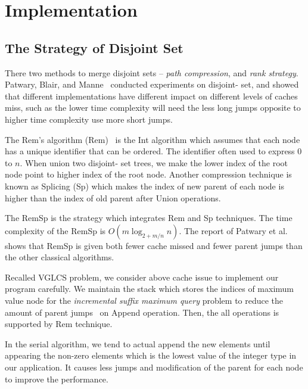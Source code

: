 \section{Implementation}
\label{sec:Implementation}

\subsection{The Strategy of Disjoint Set}

There two methods to merge disjoint sets -- {\em path compression}, and
{\em rank strategy}.  Patwary, Blair, and
Manne~\cite{Patwary2010ExperimentsOU} conducted experiments on disjoint-
set, and showed that different implementations have different impact on
different levels of caches miss, such as the lower time complexity will
need the less long jumps opposite to higher time complexity use more
short jumps. %


The Rem's algorithm ({\sc Rem})~\cite{dijkstra1976a} is the {\sc Int}
algorithm which assumes that each node has a unique identifier that can
be ordered.  The identifier often used to express $0$ to $n$.  When
union two disjoint- set trees, we make the lower index of the root node
point to higher index of the root node. Another compression technique is
known as {\sc Splicing} ({\sc Sp}) which makes the index of new parent
of each node is higher than the index of old parent after {\sc Union}
operations.

The {\sc RemSp} is the strategy which integrates {\sc Rem} and {\sc Sp}
techniques.  The time complexity of the {\sc RemSp} is $O(m \log_{2+m/n}
n)$.  The report of Patwary et al.~\cite{Patwary2010ExperimentsOU} shows
that {\sc RemSp} is given both fewer cache missed and fewer parent jumps
than the other classical algorithms.

Recalled VGLCS problem, we consider above cache issue to implement our
program carefully.  We maintain the stack which stores the indices of
maximum value node for the {\em incremental suffix maximum query}
problem to reduce the amount of parent jumps~\cite{Peng2011TheLC} on {\sc
Append} operation.  Then, the all operations is supported by {\sc Rem}
technique.

In the serial algorithm, we tend to actual append the new elements until
appearing the non-zero elements which is the lowest value of the integer
type in our application.  It causes less jumps and modification of the
parent for each node to improve the performance.

